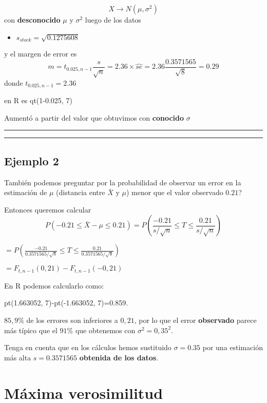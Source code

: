 \documentclass[
]{book}
\providecommand{\tightlist}{%
  \setlength{\itemsep}{0pt}\setlength{\parskip}{0pt}}
\begin{document}
\[X \rightarrow N(\mu, \sigma^2)\]
con \textbf{desconocido} \(\mu\) y \(\sigma^2\) luego de los datos

\begin{itemize}
\tightlist
\item
  \(s_{stock}=\sqrt{0.1275608}\)
\end{itemize}

y el margen de error es \[m=t_{0.025, n-1} \frac{s}{\sqrt{n}}=2.36\times \hat{se}=2.36\frac{0.3571565}{\sqrt{ 8}}=0.29\]
donde \(t_{0.025, n-1}=2.36\)

en R es qt(1-0.025, 7)

Aumentó a partir del valor que obtuvimos con \textbf{conocido} \(\sigma\)

\begin{center}\rule{0.5\linewidth}{0.5pt}\end{center}

\begin{center}\rule{0.5\linewidth}{0.5pt}\end{center}

\hypertarget{ejemplo-2-2}{%
\section{Ejemplo 2}\label{ejemplo-2-2}}

También podemos preguntar por la probabilidad de observar un error en la estimación de \(\mu\) (distancia entre \(\bar{X}\) y \(\mu\)) menor que el valor observado \(0.21\)?

Entonces queremos calcular \[P(-0.21 \leq \bar{X} - \mu\leq 0.21)=P(\frac{-0.21}{s/\sqrt{n}} \leq T \leq \frac {0.21}{s/\sqrt{n}})\]

\(=P(\frac{-0.21}{0.3571565/\sqrt{8}} \leq T \leq \frac{0.21}{0.3571565/\sqrt{8}})\)

\(=F_{t, n-1}(0,21)-F_{t, n-1}(-0,21)\)

En R podemos calcularlo como:

pt(1.663052, 7)-pt(-1.663052, 7)=0.859.

\(85,9\%\) de los errores son inferiores a \(0,21\), por lo que el error \textbf{observado} parece más típico que el \(91\%\) que obtenemos con \(\sigma^2=0,35^2\).

Tenga en cuenta que en los cálculos hemos sustituido \(\sigma=0.35\) por una estimación más alta \(s=0.3571565\) \textbf{obtenida de los datos}.

\hypertarget{muxe1xima-verosimilitud}{%
\chapter{Máxima verosimilitud}\label{muxe1xima-verosimilitud}}
\end{document}
